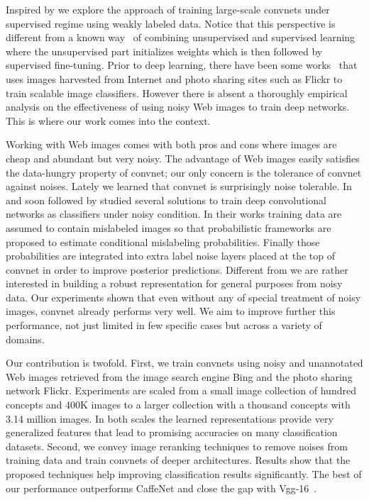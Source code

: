 \documentclass[preprint,12pt]{elsarticle}
\begin{document}
Inspired by \cite{DBLP:conf/nips/DosovitskiySRB14} we explore the approach of training large-scale convnets under supervised regime using weakly labeled data. Notice that this perspective is different from a known way~\cite{DBLP:journals/neco/HintonOT06} of combining unsupervised and supervised learning where the unsupervised part initializes weights which is then followed by supervised fine-tuning. Prior to deep learning, there have been some works~\cite{DBLP:journals/tmm/UlgesWB11,DBLP:journals/pami/WangHF12} that uses images harvested from Internet and photo sharing sites such as Flickr to train scalable image classifiers. However there is absent a thoroughly empirical analysis on the effectiveness of using noisy Web images to train deep networks. This is where our work comes into the context. 

Working with Web images comes with both pros and cons where images are cheap and abundant but very noisy. The advantage of Web images easily satisfies the data-hungry property of convnet; our only concern is the tolerance of convnet against noises. Lately we learned that convnet is surprisingly noise tolerable. In~\cite{sukhbaatar2014learning} and soon followed by \cite{xiao2015learning} studied several solutions to train deep convolutional networks as classifiers under noisy condition. In their works training data are assumed to contain mislabeled images so that probabilistic frameworks are proposed to estimate conditional mislabeling probabilities. Finally those probabilities are integrated into extra label noise layers placed at the top of convnet in order to improve posterior predictions. Different from \cite{sukhbaatar2014learning,xiao2015learning} we are rather interested in building a robust representation for general purposes from noisy data. Our experiments shown that even without any of special treatment of noisy images, convnet already performs very well. We aim to improve further this performance, not just limited in few specific cases but across a variety of domains. 

Our contribution is twofold. First, we train convnets using noisy and unannotated Web images retrieved from the image search engine Bing and the photo sharing network Flickr. Experiments are scaled from a small image collection of  hundred concepts and 400K images to a larger collection with a thousand concepts with 3.14 million images. In both scales the learned representations provide very generalized features that lead to promising accuracies on many classification datasets. Second, we convey image reranking techniques to remove noises from training data and train convnets of deeper architectures. Results show that the proposed techniques help improving classification results significantly. The best of our performance outperforms CaffeNet and close the gap with Vgg-16~\cite{DBLP:journals/corr/SimonyanZ14a}. 
\end{document}
